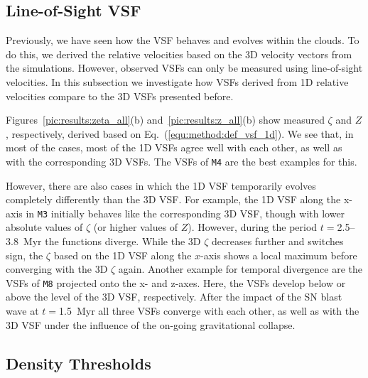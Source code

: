 \subsection{Line-of-Sight VSF}\label{results:1d}

Previously, we have seen how the VSF behaves and evolves within the clouds.
To do this, we derived the relative velocities based on the 3D velocity vectors from the simulations.
However, observed VSFs can only be measured using line-of-sight velocities.
In this subsection we investigate how VSFs derived from 1D relative velocities compare to the 3D VSFs presented before.

Figures~\ref{pic:results:zeta_all}(b) and~\ref{pic:results:z_all}(b) show measured $\zeta$ and $Z$, respectively, derived based on Eq.~(\ref{equ:method:def_vsf_1d}). 
We see that, in most of the cases, most of the 1D VSFs agree well with each other, as well as with the corresponding 3D VSFs.
The VSFs of \texttt{M4} are the best examples for this.

However, there are also cases in which the 1D VSF temporarily evolves completely differently than the 3D VSF.
For example, the 1D VSF along the x-axis in \texttt{M3} initially behaves like the corresponding 3D VSF, though with lower absolute values of $\zeta$ (or higher values of $Z$).
However, during the period $t=$2.5--3.8~Myr the functions diverge. 
While the 3D $\zeta$ decreases further and switches sign, the $\zeta$ based on the 1D VSF along the $x$-axis shows a local maximum before converging with the 3D $\zeta$ again. 
Another example for temporal divergence are the VSFs of \texttt{M8} projected onto the x- and z-axes. 
Here, the VSFs develop below or above the level of the 3D VSF, respectively.
After the impact of the SN blast wave at $t=$1.5~Myr all three VSFs converge with each other, as well as with the 3D VSF under the influence of the on-going gravitational collapse.



\subsection{Density Thresholds}\label{results:densthres}

